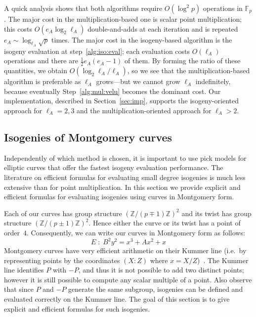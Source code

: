 \documentclass[envcountsect,envcountsame,runningheads]{llncs}   %
\newcommand{\ZZ}{{\mathbb{Z}}}
\newcommand{\FF}{{\mathbb{F}}}
\begin{document}
A quick analysis shows that both algorithms require $O(\log^2 p)$
operations in $\FF_p$. The major cost in the multiplication-based one
is scalar point multiplication; this costs $O(e_A\log_2\ell_A)$
double-and-adds at each iteration and is repeated
$e_A\sim\log_{\ell_A}\sqrt{p}$ times. The major cost in the
isogeny-based algorithm is the isogeny evaluation at
step~\ref{alg:iso:eval}; each evaluation costs $O(\ell_A)$ operations
and there are $\frac{1}{2}e_A(e_A-1)$ of them. By forming the ratio of
these quantities, we obtain $O(\log_2\ell_A/\ell_A)$, so we see that
the multiplication-based algorithm is preferable as $\ell_A$
grows---but we cannot grow $\ell_A$ indefinitely, because eventually
Step~\ref{alg:mul:velu} becomes the dominant cost. Our implementation,
described in Section~\ref{sec:imp}, supports the isogeny-oriented
approach for $\ell_A = 2,3$ and the multiplication-oriented approach
for $\ell_A > 2$.

\subsection{Isogenies of Montgomery curves}\label{subsec:montgomery}

Independently of which method is chosen, it is important to use pick
models for elliptic curves that offer the fastest isogeny evaluation
performance. The literature on efficient formulas for evaluating small
degree isogenies is much less extensive than for point
multiplication. In this section we provide explicit and efficient
formulas for evaluating isogenies using curves in Montgomery form.

Each of
our curves has group structure $\left(\ZZ/(p\mp 1)\ZZ\right)^2$ and
its twist has group structure $\left(\ZZ/(p\pm 1)\ZZ\right)^2$. Hence either
the curve or its twist has a point of order~$4$. Consequently, we can write
our curves in Montgomery form as follows:
\begin{equation}
  \label{eq:montgomery}
  E\;:\;B^2y^2 = x^3 + Ax^2 + x
\end{equation}
Montgomery curves have very efficient arithmetic on their Kummer line
(i.e.\ by representing points by the coordinates $(X:Z)$ where
$x=X/Z$)~\cite{montgomery}. The Kummer line identifies $P$ with $-P$,
and thus it is not possible to add two distinct points; however it is
still possible to compute any scalar multiple of a point.  Also
observe that since $P$ and $-P$ generate the same subgroup, isogenies
can be defined and evaluated correctly on the Kummer line.  The goal
of this section is to give explicit and efficient formulas for such
isogenies.
\end{document}
